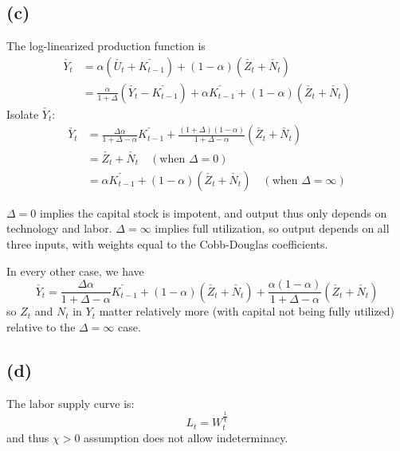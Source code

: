 \documentclass[11pt]{amsart}
\begin{document}
\subsection*{(c)}

The log-linearized production function is
	\begin{align*}
	\check{Y_t} &= \alpha \left( \check{U_t} + \check{K_{t-1}} \right) + (1-\alpha) \left(  \check{Z_t} + \check{N_t}\right) \\
	& = \frac{\alpha}{1 + \Delta} \left( \check{Y_t} - \check{K_{t-1}} \right) + \alpha \check{K_{t-1}} + (1-\alpha ) \left(  \check{Z_t} + \check{N_t}\right)
	\end{align*} 
	Isolate $\check{Y_t}$:
	\begin{align*}
	\check{Y_t} &= \frac{\Delta \alpha }{1 + \Delta - \alpha} \check{K_{t-1}} + \frac{(1+\Delta)(1-\alpha)}{1+ \Delta - \alpha} \left(  \check{Z_t} + \check{N_t} \right)  \\
	& = \check{Z_t} + \check{N_t} \quad \left( \text{when } \Delta = 0 \right) \\
	& = \alpha \check{K_{t-1}} + (1-\alpha) \left( \check{Z_t } + \check{N_t} \right)   \quad \left( \text{when } \Delta = \infty \right)
	\end{align*}

     $\Delta = 0$ implies the capital stock is impotent, and output thus only depends on technology and labor. 
$\Delta = \infty$ implies full utilization, so output depends on all three inputs, with weights equal to the Cobb-Douglas coefficients. 
    
In every other case, we have 
    \begin{equation*}
    \check{Y_t} = \frac{\Delta \alpha }{1 + \Delta - \alpha} \check{K_{t-1}} + (1-\alpha) \left( \check{Z_t} + \check{N_t} \right)+ \frac{\alpha (1-\alpha)}{1+ \Delta - \alpha} \left(  \check{Z_t} + \check{N_t} \right)
    \end{equation*}
    so $Z_t$ and $N_t$ in $Y_t$ matter relatively more (with capital not being fully utilized) relative to the $\Delta = \infty$ case. 

\subsection*{(d)} 

The labor supply curve is: 
    \begin{equation*}
    L_t = W_t^{\frac{1}{\chi}}
    \end{equation*}
    and thus $\chi >0$ assumption does not allow indeterminacy.
    
\end{document}
